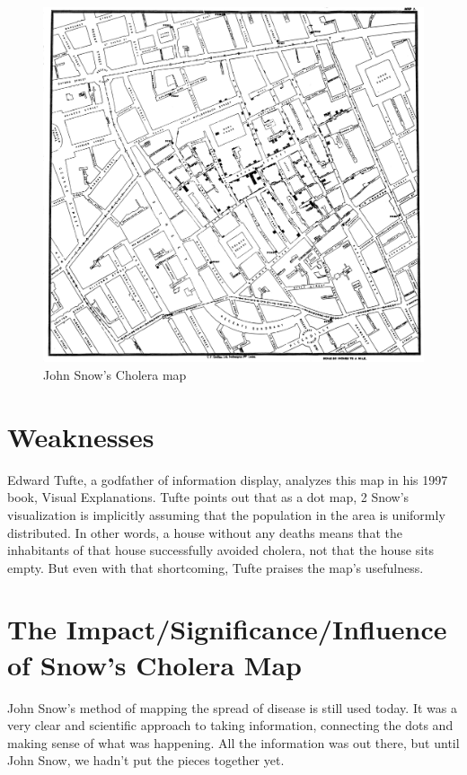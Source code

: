 \documentclass[12pt]{article}
\begin{document}
    \begin{figure}
    \centering
    \includegraphics[scale=0.1]{Snow-cholera-map-1}
    \caption{John Snow's Cholera map}
    \label{fig:snow}
    \end{figure}



\section{Weaknesses}

Edward Tufte, a godfather of information display, analyzes this map in his 1997 book, Visual Explanations. Tufte points out that as a dot map, 2 Snow’s visualization is implicitly assuming that the population in the area is uniformly distributed. In other words, a house without any deaths means that the inhabitants of that house successfully avoided cholera, not that the house sits empty. But even with that shortcoming, Tufte praises the map’s usefulness. \cite{blog}

\section{The Impact/Significance/Influence of Snow's Cholera Map}

John Snow's method of mapping the spread of disease is still used today. It was a very clear and scientific approach to taking information, connecting the dots and making sense of what was happening. All the information was out there, but until John Snow, we hadn't put the pieces together yet. \cite{channel1}
\end{document}
